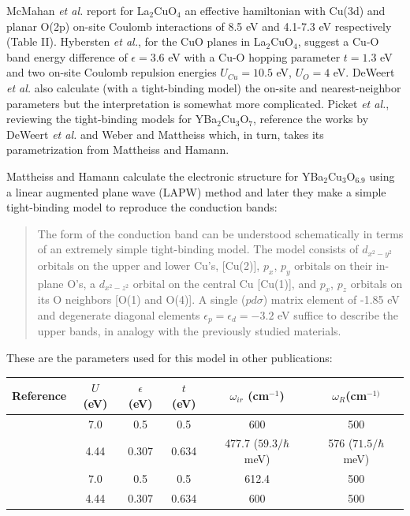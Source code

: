 McMahan \textit{et al.}\cite{McMahan1988} report for La$_{2}$CuO$_{4}$ an effective hamiltonian with Cu(3d) and planar O(2p) on-site Coulomb interactions of 8.5 eV and 4.1-7.3 eV respectively (Table II). Hybersten \textit{et al.}\cite{Hybertsen1989}, for the CuO planes in La$_{2}$CuO$_{4}$, suggest a Cu-O band energy difference of $\epsilon = 3.6$ eV with a Cu-O hopping parameter $t = 1.3$ eV and two on-site Coulomb repulsion energies $U_{Cu} = 10.5$ eV, $U_O = 4$ eV. DeWeert \textit{et al.}\cite{DeWeert1989} also calculate (with a tight-binding model) the on-site and nearest-neighbor parameters but the interpretation is somewhat more complicated. Picket \textit{et al.}\cite{Pickett1989}, reviewing the tight-binding models for YBa$_{2}$Cu$_{3}$O$_{7}$, reference the works by DeWeert \textit{et al.}\cite{DeWeert1989} and Weber and Mattheiss\cite{Weber1988} which, in turn, takes its parametrization from Mattheiss and Hamann\cite{Mattheiss1987}.

Mattheiss and Hamann\cite{Mattheiss1987} calculate the electronic structure for YBa$_{2}$Cu$_{3}$O$_{6.9}$ using a linear augmented plane wave (LAPW) method and later they make a simple tight-binding model to reproduce the conduction bands:

\begin{quote}The form of the conduction band can be understood schematically in terms of an extremely simple tight-binding model. The model consists of $d_{x^2-y^2}$ orbitals on the upper and lower Cu's, [Cu(2)], $p_x$, $p_y$ orbitals on their in-plane O's, a $d_{x^2-z^2}$ orbital on the central Cu [Cu(1)], and $p_x$, $p_z$ orbitals on its O neighbors [O(1) and O(4)]. A single ($pd\sigma$) matrix element of -1.85 eV and degenerate diagonal elements $\epsilon_p = \epsilon_d=-3.2$ eV suffice to describe the upper bands, in analogy with the previously studied materials.
\end{quote}

These are the parameters used for this model in other publications:

\noindent\begin{tabular}{| l | c | c | c | c | c |}
\hline
Reference & $U$ (eV) & $\epsilon$ (eV) & $t$ (eV) & $\omega_{ir}$ (cm$^{-1}$) & $\omega_R$(cm$^{-1)}$ \\
\hline
\cite{MustredeLeon1992} & 7.0 & 0.5 & 0.5 & 600 & 500 \\ 
\cite{Salkola1994, Salkola1995} & 4.44 & 0.307 & 0.634 & 477.7 ($59.3/\hbar$ meV) & 576 ($71.5/\hbar$ meV) \\
\cite{DeLeon1999, Mena2006, Leon2008, MirandaMena2007} & 7.0 & 0.5 & 0.5 & 612.4 & 500 \\ 
\cite{MustredeLeon2000} & 4.44 & 0.307 & 0.634 & 600 & 500 \\
\hline
\end{tabular}

